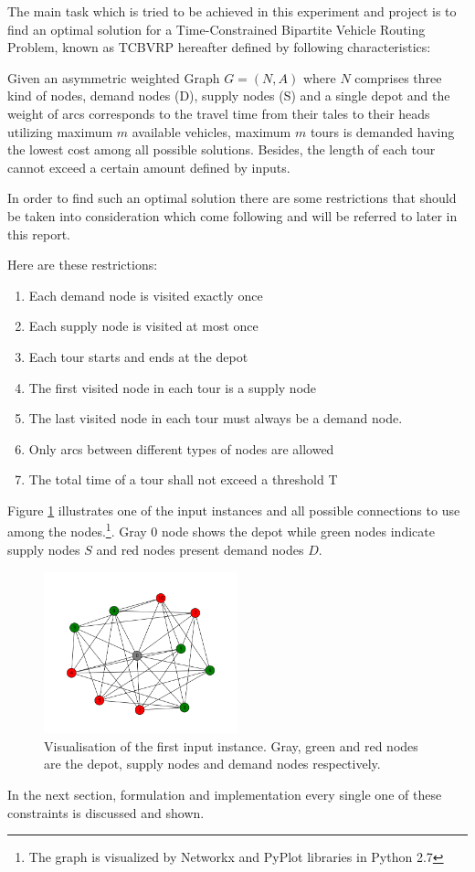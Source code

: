 The main task which is tried to be achieved in this experiment and project
is to find an optimal solution for a Time-Constrained Bipartite Vehicle Routing
Problem, known as TCBVRP hereafter defined by following
characteristics:

Given an asymmetric weighted Graph $G=(N,A)$ where $N$ comprises three
kind of nodes, demand nodes (D), supply nodes (S) and a single depot and the weight of
arcs corresponds to the travel time from their tales to their heads utilizing
maximum $m$ available vehicles, maximum $m$ tours is demanded having the lowest cost
among all possible solutions. Besides, the length of each tour cannot exceed a
certain amount defined by inputs.

In order to find such an optimal solution there are some restrictions that
should be taken into consideration which come following and will be referred to
later in this report.

Here are these restrictions:

\begin{enumerate}
  \item Each demand node is visited exactly once
  \item Each supply node is visited at most once
  \item Each tour starts and ends at the depot
  \item The first visited node in each tour is a supply node
  \item The last visited node in each tour must always be a demand
node.
\item Only arcs between different types of nodes are allowed
\item The total time of a tour shall not exceed a threshold T
\end{enumerate}

Figure \ref{fig:vis} illustrates one of the input instances and all
possible connections to use among the nodes.\footnote{The graph is visualized by
Networkx\cite{hagberg2004networkx} and PyPlot libraries in Python 2.7}. Gray $0$ node shows the depot while green nodes indicate supply
nodes $S$ and red nodes present demand nodes $D$.

\begin{figure}[H]
  \centering
    \includegraphics[width=0.5\textwidth]{./figures/instance1.png}
    
  \caption{\label{fig:vis} Visualisation of the first input instance. Gray,
  green and red nodes are the depot, supply nodes and demand nodes
  respectively.}
  
\end{figure}

In the next section, formulation and implementation every single one of these
constraints is discussed and shown.
